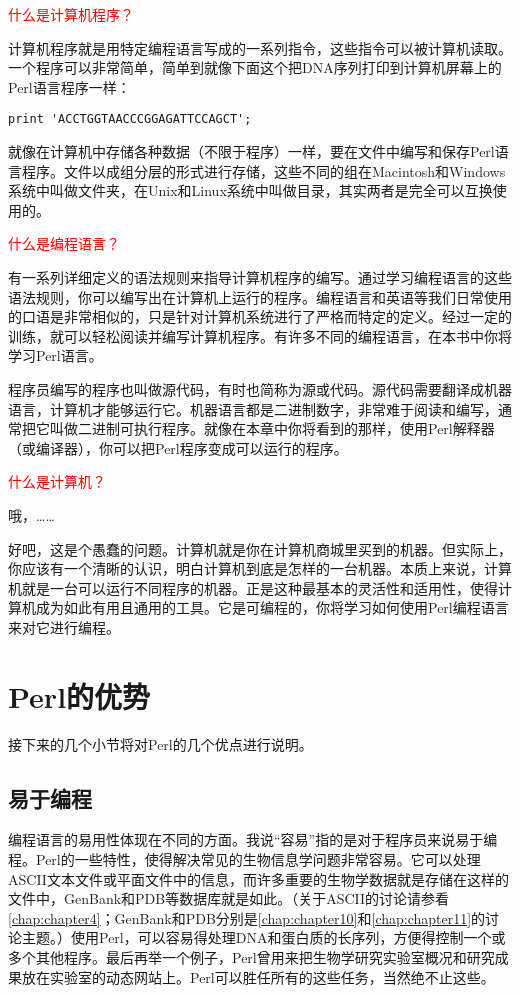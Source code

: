 \textcolor{red}{什么是计算机程序？}

\begin{adjustwidth}{1cm}{}
计算机程序就是用特定编程语言写成的一系列指令，这些指令可以被计算机读取。一个程序可以非常简单，简单到就像下面这个把DNA序列打印到计算机屏幕上的Perl语言程序一样：

\noindent
\verb|print 'ACCTGGTAACCCGGAGATTCCAGCT';|

就像在计算机中存储各种数据（不限于程序）一样，要在文件中编写和保存Perl语言程序。文件以成组分层的形式进行存储，这些不同的组在Macintosh和Windows系统中叫做文件夹，在Unix和Linux系统中叫做目录，其实两者是完全可以互换使用的。
\end{adjustwidth}

\textcolor{red}{什么是编程语言？}

\begin{adjustwidth}{1cm}{}
有一系列详细定义的语法规则来指导计算机程序的编写。通过学习编程语言的这些语法规则，你可以编写出在计算机上运行的程序。编程语言和英语等我们日常使用的口语是非常相似的，只是针对计算机系统进行了严格而特定的定义。经过一定的训练，就可以轻松阅读并编写计算机程序。有许多不同的编程语言，在本书中你将学习Perl语言。

程序员编写的程序也叫做源代码，有时也简称为源或代码。源代码需要翻译成机器语言，计算机才能够运行它。机器语言都是二进制数字，非常难于阅读和编写，通常把它叫做二进制可执行程序。就像在本章中你将看到的那样，使用Perl解释器（或编译器），你可以把Perl程序变成可以运行的程序。
\end{adjustwidth}

\textcolor{red}{什么是计算机？}

\begin{adjustwidth}{1cm}{}
哦，……

好吧，这是个愚蠢的问题。计算机就是你在计算机商城里买到的机器。但实际上，你应该有一个清晰的认识，明白计算机到底是怎样的一台机器。本质上来说，计算机就是一台可以运行不同程序的机器。正是这种最基本的灵活性和适用性，使得计算机成为如此有用且通用的工具。它是可编程的，你将学习如何使用Perl编程语言来对它进行编程。
\end{adjustwidth}

\section{Perl的优势}
接下来的几个小节将对Perl的几个优点进行说明。

\subsection{易于编程}
编程语言的易用性体现在不同的方面。我说“容易”指的是对于程序员来说易于编程。Perl的一些特性，使得解决常见的生物信息学问题非常容易。它可以处理ASCII文本文件或平面文件中的信息，而许多重要的生物学数据就是存储在这样的文件中，GenBank和PDB等数据库就是如此。（关于ASCII的讨论请参看\autoref{chap:chapter4}；GenBank和PDB分别是\autoref{chap:chapter10}和\autoref{chap:chapter11}的讨论主题。）使用Perl，可以容易得处理DNA和蛋白质的长序列，方便得控制一个或多个其他程序。最后再举一个例子，Perl曾用来把生物学研究实验室概况和研究成果放在实验室的动态网站上。Perl可以胜任所有的这些任务，当然绝不止这些。

